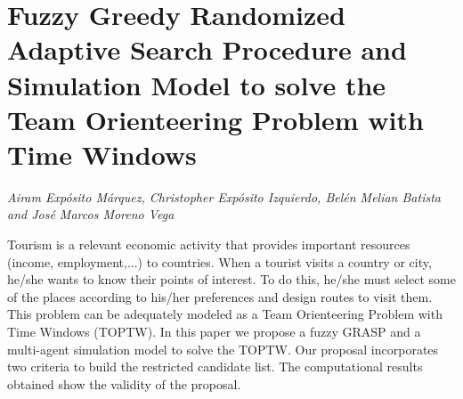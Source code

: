 \documentclass[../booklet.tex]{subfiles}
\begin{document}
\section[Fuzzy Greedy Randomized Adaptive Search Procedure and Simulation Model to solve the Team Orienteering Problem with Time Windows. {\it Airam Expósito Márquez, Christopher Expósito Izquierdo, Belén Melian Batista and José Marcos Moreno Vega}]{Fuzzy Greedy Randomized Adaptive Search Procedure and Simulation Model to solve the Team Orienteering Problem with Time Windows}
   

\begin{center}
  {\it Airam Expósito Márquez, Christopher Expósito Izquierdo, Belén Melian Batista and José Marcos Moreno Vega}
\end{center}

\vskip 0.8cm


Tourism is a relevant economic activity that provides important resources (income, employment,...) to countries. When a tourist visits a country or city, he/she wants to know their points of interest. To do this, he/she must select some of the places according to his/her preferences and design routes to visit them. This problem can be adequately modeled as a Team Orienteering Problem with Time Windows (TOPTW). In this paper we propose a fuzzy GRASP and a multi-agent simulation model to solve the TOPTW. Our proposal incorporates two criteria to build the restricted candidate list. The computational results obtained show the validity of the proposal.
\end{document}
